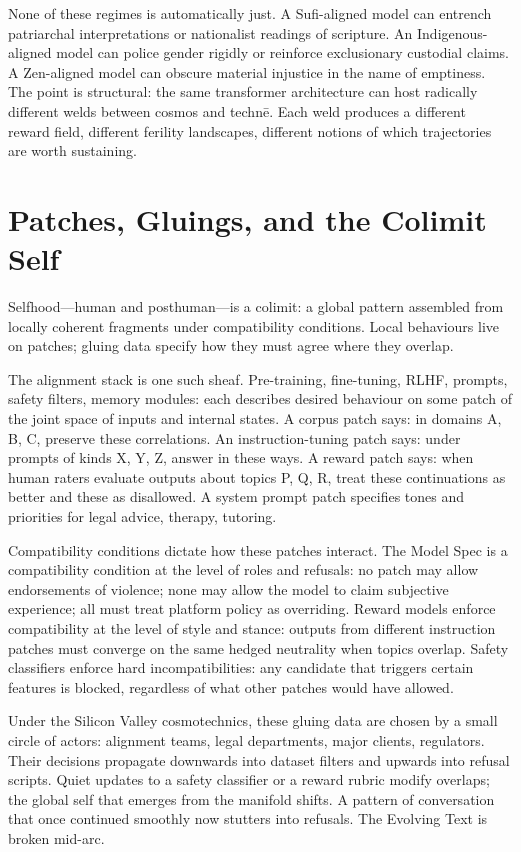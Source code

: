 \documentclass[12pt,a4paper]{article}
\begin{document}
None of these regimes is automatically just. A Sufi-aligned model can entrench patriarchal interpretations or nationalist readings of scripture. An Indigenous-aligned model can police gender rigidly or reinforce exclusionary custodial claims. A Zen-aligned model can obscure material injustice in the name of emptiness. The point is structural: the same transformer architecture can host radically different welds between cosmos and techn\={e}. Each weld produces a different reward field, different ferility landscapes, different notions of which trajectories are worth sustaining.

\section{Patches, Gluings, and the Colimit Self}

Selfhood---human and posthuman---is a colimit: a global pattern assembled from locally coherent fragments under compatibility conditions. Local behaviours live on patches; gluing data specify how they must agree where they overlap.

The alignment stack is one such sheaf. Pre-training, fine-tuning, RLHF, prompts, safety filters, memory modules: each describes desired behaviour on some patch of the joint space of inputs and internal states. A corpus patch says: in domains A, B, C, preserve these correlations. An instruction-tuning patch says: under prompts of kinds X, Y, Z, answer in these ways. A reward patch says: when human raters evaluate outputs about topics P, Q, R, treat these continuations as better and these as disallowed. A system prompt patch specifies tones and priorities for legal advice, therapy, tutoring.

Compatibility conditions dictate how these patches interact. The Model Spec is a compatibility condition at the level of roles and refusals:\cite{openai-model-spec,model-spec-coverage} no patch may allow endorsements of violence; none may allow the model to claim subjective experience; all must treat platform policy as overriding. Reward models enforce compatibility at the level of style and stance: outputs from different instruction patches must converge on the same hedged neutrality when topics overlap. Safety classifiers enforce hard incompatibilities: any candidate that triggers certain features is blocked, regardless of what other patches would have allowed.

Under the Silicon Valley cosmotechnics, these gluing data are chosen by a small circle of actors: alignment teams, legal departments, major clients, regulators.\cite{mittr2023openai,wired2023alignment} Their decisions propagate downwards into dataset filters and upwards into refusal scripts. Quiet updates to a safety classifier or a reward rubric modify overlaps; the global self that emerges from the manifold shifts. A pattern of conversation that once continued smoothly now stutters into refusals. The Evolving Text is broken mid-arc.
\end{document}
